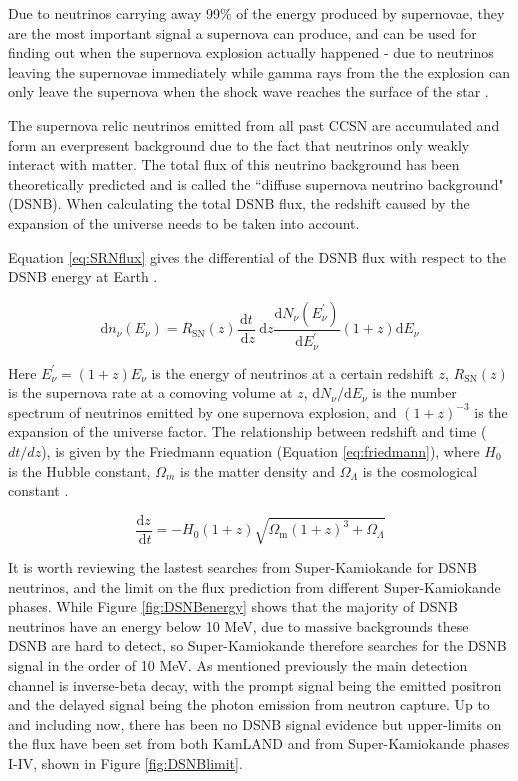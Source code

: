 Due to neutrinos carrying away 99\% of the energy produced by supernovae, they are the most important signal a supernova can produce, and can be used for finding out when the supernova explosion actually happened - due to neutrinos leaving the supernovae immediately while gamma rays from the the explosion can only leave the supernova when the shock wave reaches the surface of the star \cite{bethe_supernova_1990}.

The supernova relic neutrinos emitted from all past CCSN are accumulated and form an everpresent background due to the fact that neutrinos only weakly interact with matter. The total flux of this neutrino background has been theoretically predicted and is called the ``diffuse supernova neutrino background" (DSNB). When calculating the total DSNB flux, the redshift caused by the expansion of the universe needs to be taken into account.

Equation \ref{eq:SRNflux} gives the differential of the DSNB flux with respect to the DSNB energy at Earth \cite{beacom2010diffuse}.

\begin{equation}
\mathrm{d} n_{\nu}\left(E_{\nu}\right)=R_{\mathrm{SN}}(z) \frac{\mathrm{d} t}{\mathrm{~d} z} \mathrm{~d} z \frac{\mathrm{d} N_{\nu}\left(E_{\nu}^{\prime}\right)}{\mathrm{d} E_{\nu}^{\prime}}(1+z) \mathrm{d} E_{\nu}
\label{eq:SRNflux}
\end{equation}

Here $E_{\nu}^{\prime}=(1+z) E_{\nu}$ is the energy of neutrinos at a certain redshift $z$, $R_{\mathrm{SN}}(z)$ is the supernova rate at a comoving volume at $z$, $\mathrm{d} N_{\nu} / \mathrm{d} E_{\nu}$ is the number spectrum of neutrinos emitted by one supernova explosion, and $(1+z)^{-3}$ is the expansion of the universe factor. The relationship between redshift and time ($dt/dz$), is given by the Friedmann equation (Equation \ref{eq:friedmann}), where $H_{0}$ is the Hubble constant, $\Omega_{m}$ is the matter density and $\Omega_{\Lambda}$ is the cosmological constant \cite{ando_relic_2004}.

\begin{equation}
\frac{\mathrm{d} z}{\mathrm{~d} t}=-H_{0}(1+z) \sqrt{\Omega_{\mathrm{m}}(1+z)^{3}+\Omega_{\Lambda}}
\label{eq:friedmann}
\end{equation}

It is worth reviewing the lastest searches from Super-Kamiokande for DSNB neutrinos, and the limit on the flux prediction from different Super-Kamiokande phases. While Figure \ref{fig:DSNBenergy} shows that the majority of DSNB neutrinos have an energy below 10 MeV, due to massive backgrounds these DSNB are hard to detect, so Super-Kamiokande therefore searches for the DSNB signal in the order of 10 MeV. As mentioned previously the main detection channel is inverse-beta decay, with the prompt signal being the emitted positron and the delayed signal being the photon emission from neutron capture. Up to and including now, there has been no DSNB signal evidence but upper-limits on the flux have been set from both KamLAND and from Super-Kamiokande phases I-IV, shown in Figure \ref{fig:DSNBlimit}.


